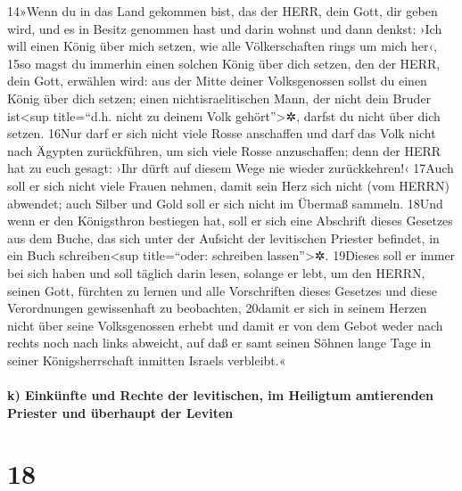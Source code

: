 14»Wenn du in das Land gekommen bist, das der HERR, dein Gott, dir geben
wird, und es in Besitz genommen hast und darin wohnst und dann denkst:
›Ich will einen König über mich setzen, wie alle Völkerschaften rings um
mich her‹, 15so magst du immerhin einen solchen König über dich setzen,
den der HERR, dein Gott, erwählen wird: aus der Mitte deiner
Volksgenossen sollst du einen König über dich setzen; einen
nichtisraelitischen Mann, der nicht dein Bruder ist\textless sup
title=``d.h. nicht zu deinem Volk gehört''\textgreater✲, darfst du nicht
über dich setzen. 16Nur darf er sich nicht viele Rosse anschaffen und
darf das Volk nicht nach Ägypten zurückführen, um sich viele Rosse
anzuschaffen; denn der HERR hat zu euch gesagt: ›Ihr dürft auf diesem
Wege nie wieder zurückkehren!‹ 17Auch soll er sich nicht viele Frauen
nehmen, damit sein Herz sich nicht (vom HERRN) abwendet; auch Silber und
Gold soll er sich nicht im Übermaß sammeln. 18Und wenn er den
Königsthron bestiegen hat, soll er sich eine Abschrift dieses Gesetzes
aus dem Buche, das sich unter der Aufsicht der levitischen Priester
befindet, in ein Buch schreiben\textless sup title=``oder: schreiben
lassen''\textgreater✲. 19Dieses soll er immer bei sich haben und soll
täglich darin lesen, solange er lebt, um den HERRN, seinen Gott,
fürchten zu lernen und alle Vorschriften dieses Gesetzes und diese
Verordnungen gewissenhaft zu beobachten, 20damit er sich in seinem
Herzen nicht über seine Volksgenossen erhebt und damit er von dem Gebot
weder nach rechts noch nach links abweicht, auf daß er samt seinen
Söhnen lange Tage in seiner Königsherrschaft inmitten Israels
verbleibt.«

\hypertarget{k-einkuxfcnfte-und-rechte-der-levitischen-im-heiligtum-amtierenden-priester-und-uxfcberhaupt-der-leviten}{%
\paragraph{k) Einkünfte und Rechte der levitischen, im Heiligtum
amtierenden Priester und überhaupt der
Leviten}\label{k-einkuxfcnfte-und-rechte-der-levitischen-im-heiligtum-amtierenden-priester-und-uxfcberhaupt-der-leviten}}

\hypertarget{section-17}{%
\section{18}\label{section-17}}


